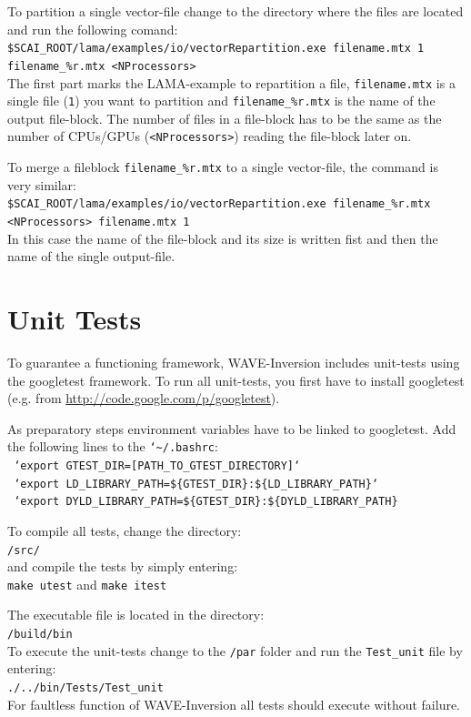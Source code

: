 \documentclass[pdftex,a4paper,parskip,listof=totoc,bibliography=totoc,onehalfspacing,12pt]{scrreprt}
\newcommand{\shellcmd}[1]{\indent\indent\texttt{#1}}	%
\newcommand{\shellcmdline}[1]{\indent\indent\texttt{\quad#1}} 	%
\begin{document}
To partition a single vector-file change to the directory where the files are located and run the following comand:  \\
\shellcmdline{\$SCAI\_ROOT/lama/examples/io/vectorRepartition.exe filename.mtx 1 }\\
\shellcmdline{filename\_\%r.mtx <NProcessors>}\\
The first part marks the LAMA-example to repartition a file, \shellcmd{filename.mtx} is a single file (\shellcmd{1}) you want to partition and \shellcmd{filename\_\%r.mtx} is the name of the output file-block. The number of files in a file-block has to be the same as the number of CPUs/GPUs (\shellcmd{<NProcessors>}) reading the file-block later on. 

To merge a fileblock \shellcmd{filename\_\%r.mtx} to a single vector-file, the command is very similar:\\
\shellcmdline{\$SCAI\_ROOT/lama/examples/io/vectorRepartition.exe filename\_\%r.mtx}\\
\shellcmdline{<NProcessors> filename.mtx 1}\\
In this case the name of the file-block and its size is written fist and then the name of the single output-file.

\section{Unit Tests}
To guarantee a functioning framework, WAVE-Inversion includes unit-tests using the googletest framework. To run all unit-tests, you first have to install googletest (e.g. from \url{http://code.google.com/p/googletest}). 

As preparatory steps environment variables have to be linked to googletest. Add the following lines to the \shellcmd{{\char`\~}/.bashrc}:
\\\shellcmdline{ `export GTEST\_DIR=[PATH\_TO\_GTEST\_DIRECTORY]`}
\\\shellcmdline{ `export LD\_LIBRARY\_PATH=\$\{GTEST\_DIR\}:\$\{LD\_LIBRARY\_PATH\}`}
\\\shellcmdline{ `export DYLD\_LIBRARY\_PATH=\$\{GTEST\_DIR\}:\$\{DYLD\_LIBRARY\_PATH\}}

To compile all tests, change the directory: \\\shellcmdline{/src/} \\ and compile the tests by simply entering:\\\shellcmdline{make utest} and \shellcmdline{make itest}

The executable file is located in the directory:
\\\shellcmdline{/build/bin}\\
To execute the unit-tests change to the \shellcmd{/par} folder and run the \shellcmd{Test\_unit} file by entering:
\\\shellcmdline{./../bin/Tests/Test\_unit}\\ 
For faultless function of WAVE-Inversion all tests should execute without failure.
\end{document}
